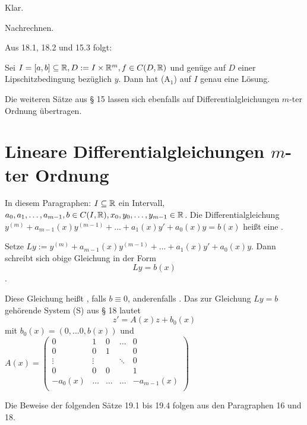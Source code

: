 \documentclass[a4paper,twoside,DIV15,BCOR12mm]{scrbook}
\begin{document}
\begin{beweis}
\begin{liste}
\item Klar.
\item Nachrechnen.
\end{liste}
\end{beweis}

Aus 18.1, 18.2 und 15.3 folgt:

\begin{satz}
Sei $I=[a,b] \subseteq \mathbb{R}, D:=I\times \mathbb{R}^m, f \in C(D,\mathbb{R})$ und genüge auf $D$ einer Lipschitzbedingung bezüglich $y$. Dann hat (A$_1$) auf $I$ genau eine Lösung.
\end{satz}

\begin{bemerkung}
Die weiteren Sätze aus § 15 lassen sich ebenfalls auf Differentialgleichungen $m$-ter Ordnung übertragen.
\end{bemerkung}

\chapter{Lineare Differentialgleichungen $m$-ter Ordnung}

In diesem Paragraphen: $I \subseteq \mathbb{R}$ ein Intervall, $a_0, a_1, \ldots,
a_{m-1}, b \in C(I,\mathbb{R}), x_0, y_0, \ldots, y_{m-1} \in \mathbb{R}$. Die
Differentialgleichung $y^{(m)} + a_{m-1}(x)y^{(m-1)} + \ldots + a_1(x)y' +
a_0(x)y = b(x)$ heißt eine .

Setze $Ly:= y^{(m)} + a_{m-1}(x)y^{(m-1)} + \ldots + a_1(x)y' + a_0(x)y$. Dann schreibt sich obige Gleichung in der Form
$$Ly = b(x)$$.

Diese Gleichung heißt , falls $b\equiv 0$, anderenfalls .
Das zur Gleichung $Ly=b$ gehörende System (S) aus § 18 lautet
$$z'=A(x)z+b_0(x)$$
mit $b_0(x) = (0, \ldots 0, b(x))$ und $A(x) =\begin{pmatrix}
0 & 1 & 0 & \ldots & 0\\
0 & 0 & 1 & & 0\\
\vdots & \vdots & & \ddots & 0\\
0 & 0 & 0 & & 1\\
-a_0(x) & \ldots & \ldots & \ldots & -a_{m-1}(x)\\
\end{pmatrix}$

Die Beweise der folgenden Sätze 19.1 bis 19.4 folgen aus den Paragraphen 16 und 18.
\end{document}
